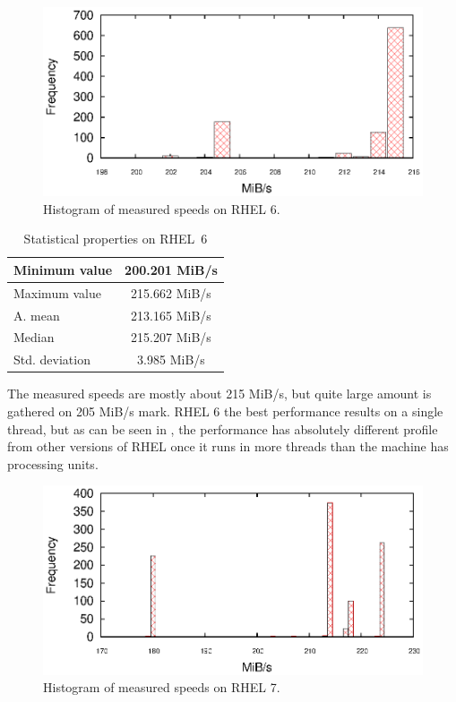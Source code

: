 \begin{figure}[h!]
  \centering
 \includegraphics[width=12cm]{fig/tests/scattering_rhel6.eps} %
\caption{Histogram of measured speeds on RHEL 6.}
\label{fig:testing:stability-r6}
\end{figure}

\begin{table}[h!]
\begin{center}
\begin{tabular}{|l|c|}
  \hline
  Minimum value& 200.201 MiB/s\\
  \hline
  Maximum value& 215.662 MiB/s\\ 
  \hline
  A. mean & 213.165 MiB/s\\
  \hline
  Median & 215.207 MiB/s\\
  \hline
  Std. deviation & 3.985 MiB/s \\
  \hline
\end{tabular}
\caption{Statistical properties on RHEL~6}
\label{tab:testing:stability-stat-r6}
\end{center}
\end{table}

The measured speeds are mostly about 215 MiB/s, but quite large amount is gathered on 205 MiB/s mark. RHEL 6 the best performance results on a single thread, but as can be seen in , the performance has absolutely different profile from other versions of RHEL once it runs in more threads than the machine has processing units.

\begin{figure}[h!]
  \centering
 \includegraphics[width=12cm]{fig/tests/scattering_rhel7.eps} %
\caption{Histogram of measured speeds on RHEL 7.}
\label{fig:testing:stability-r7}
\end{figure}

